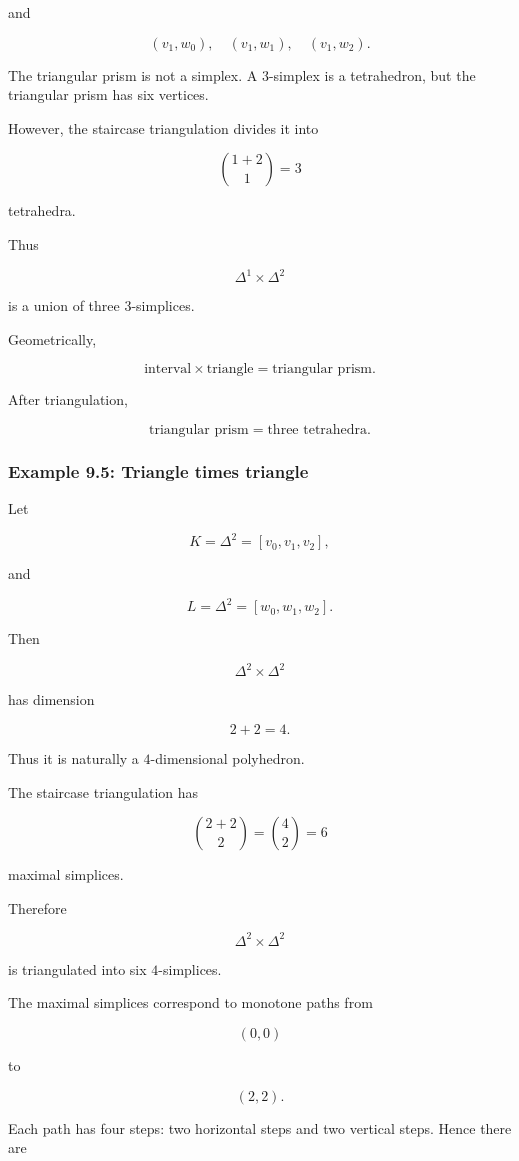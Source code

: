 \documentclass[12pt,a4paper]{article}
\theoremstyle{notespace}
\begin{document}
and

\[
(v_1,w_0),
\quad
(v_1,w_1),
\quad
(v_1,w_2).
\]

The triangular prism is not a simplex. A \(3\)-simplex is a tetrahedron, but the triangular prism has six vertices.

However, the staircase triangulation divides it into

\[
\binom{1+2}{1}=3
\]

tetrahedra.

Thus

\[
\Delta^1\times \Delta^2
\]

is a union of three \(3\)-simplices.

Geometrically,

\[
\text{interval}\times \text{triangle}
=
\text{triangular prism}.
\]

After triangulation,

\[
\text{triangular prism}
=
\text{three tetrahedra}.
\]

\subsubsection{Example 9.5: Triangle times triangle}

Let

\[
K=\Delta^2=[v_0,v_1,v_2],
\]

and

\[
L=\Delta^2=[w_0,w_1,w_2].
\]

Then

\[
\Delta^2\times \Delta^2
\]

has dimension

\[
2+2=4.
\]

Thus it is naturally a \(4\)-dimensional polyhedron.

The staircase triangulation has

\[
\binom{2+2}{2}
=
\binom{4}{2}
=
6
\]

maximal simplices.

Therefore

\[
\Delta^2\times \Delta^2
\]

is triangulated into six \(4\)-simplices.

The maximal simplices correspond to monotone paths from

\[
(0,0)
\]

to

\[
(2,2).
\]

Each path has four steps: two horizontal steps and two vertical steps. Hence there are
\end{document}
